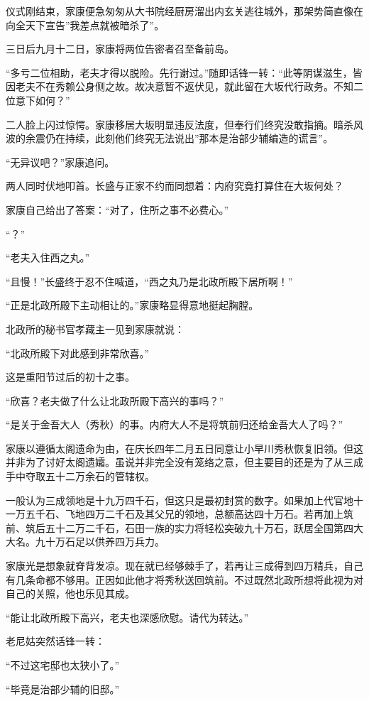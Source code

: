 \documentclass[
]{book}
\begin{document}
仪式刚结束，家康便急匆匆从大书院经厨房溜出内玄关逃往城外，那架势简直像在向全天下宣告''我差点就被暗杀了''。

三日后九月十二日，家康将两位告密者召至备前岛。

``多亏二位相助，老夫才得以脱险。先行谢过。''随即话锋一转：``此等阴谋滋生，皆因老夫不在秀赖公身侧之故。故决意暂不返伏见，就此留在大坂代行政务。不知二位意下如何？''

二人脸上闪过惊愕。家康移居大坂明显违反法度，但奉行们终究没敢指摘。暗杀风波的余震仍在持续，此刻他们终究无法说出''那本是治部少辅编造的谎言''。

``无异议吧？''家康追问。

两人同时伏地叩首。长盛与正家不约而同想着：内府究竟打算住在大坂何处？

家康自己给出了答案：``对了，住所之事不必费心。''

``？''

``老夫入住西之丸。''

``且慢！''长盛终于忍不住喊道，``西之丸乃是北政所殿下居所啊！''

``正是北政所殿下主动相让的。''家康略显得意地挺起胸膛。

北政所的秘书官孝藏主一见到家康就说：

``北政所殿下对此感到非常欣喜。''

这是重阳节过后的初十之事。

``欣喜？老夫做了什么让北政所殿下高兴的事吗？''

``是关于金吾大人（秀秋）的事。内府大人不是将筑前归还给金吾大人了吗？''

家康以遵循太阁遗命为由，在庆长四年二月五日同意让小早川秀秋恢复旧领。但这并非为了讨好太阁遗孀。虽说并非完全没有笼络之意，但主要目的还是为了从三成手中夺取五十二万余石的管辖权。

一般认为三成领地是十九万四千石，但这只是最初封赏的数字。如果加上代官地十一万五千石、飞地四万二千石及其父兄的领地，总额高达四十万石。若再加上筑前、筑后五十二万二千石，石田一族的实力将轻松突破九十万石，跃居全国第四大大名。九十万石足以供养四万兵力。

家康光是想象就脊背发凉。现在就已经够棘手了，若再让三成得到四万精兵，自己有几条命都不够用。正因如此他才将秀秋送回筑前。不过既然北政所想将此视为对自己的关照，他也乐见其成。

``能让北政所殿下高兴，老夫也深感欣慰。请代为转达。''

老尼姑突然话锋一转：

``不过这宅邸也太狭小了。''

``毕竟是治部少辅的旧邸。''
\end{document}
